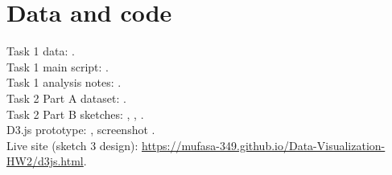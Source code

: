 \documentclass[11pt,a4paper]{article}
\begin{document}
\section*{Data and code}
\begin{sloppypar}
\noindent
Task 1 data: .\\
Task 1 main script: .\\
Task 1 analysis notes: .\\
Task 2 Part A dataset: .\\
Task 2 Part B sketches: , , .\\
D3.js prototype: , screenshot .\\
Live site (sketch 3 design): \url{https://mufasa-349.github.io/Data-Visualization-HW2/d3js.html}.
\end{sloppypar}
\end{document}

